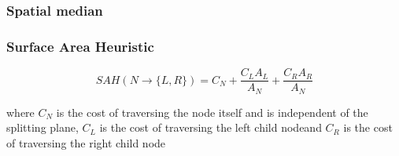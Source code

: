 


\subsubsection{Spatial median}







\subsubsection{Surface Area Heuristic}



\begin{displaymath}
  SAH(N \rightarrow \{L, R\}) = C_N + \frac{C_L A_L}{A_N} +
  \frac{C_R A_R}{A_N}
\end{displaymath}

where $C_N$ is the cost of traversing the node itself and is
independent of the splitting plane, $C_L$ is the cost of traversing
the left child nodeand $C_R$ is the cost of traversing the right child
node


